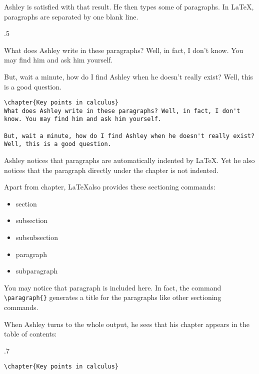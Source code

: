 \documentclass[oneside]{book}
\begin{document}
Ashley is satisfied with that result. He then types some of paragraphs. In \LaTeX{}, paragraphs are separated by one blank line.
\begin{miniexammar}{.5\textandmarginlen}{
What does Ashley write in these paragraphs? Well, in fact, I don't know. You may find him and ask him yourself.
		
\hspace{1.5em}But, wait a minute, how do I find Ashley when he doesn't really exist? Well, this is a good question.}
\begin{lstlisting}
\chapter{Key points in calculus}
What does Ashley write in these paragraphs? Well, in fact, I don't know. You may find him and ask him yourself.
		
But, wait a minute, how do I find Ashley when he doesn't really exist? Well, this is a good question.
\end{lstlisting}
\end{miniexammar}
Ashley notices that paragraphs are automatically indented by \LaTeX{}. Yet he also notices that the paragraph directly under the chapter is not indented.

Apart from chapter, \LaTeX also provides these sectioning commands:
\begin{itemize}
\item section
\item subsection
\item subsubsection
\item paragraph
\item subparagraph
\end{itemize}

You may notice that paragraph is included here. In fact, the command \verb!\paragraph{}! generates a title for the paragraphs like other sectioning commands.

When Ashley turns to the whole output, he sees that his chapter appears in the table of contents:
\begin{miniexammar}{.7\textandmarginlen}{
\faketoc
{}
}
\begin{lstlisting}
\chapter{Key points in calculus}
\end{lstlisting}
\end{miniexammar}
\end{document}
